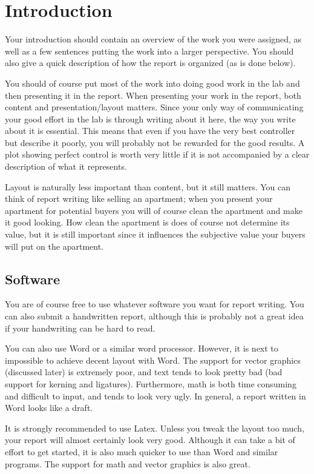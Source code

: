 \section{Introduction}
Your introduction should contain an overview of the work you were assigned, as well as a few sentences putting the work into a larger perspective. You should also give a quick description of how the report is organized (as is done below).

You should of course put most of the work into doing good work in the lab and then presenting it in the report. When presenting your work in the report, both content and presentation/layout matters. Since your only way of communicating your good effort in the lab is through writing about it here, the way you write about it is essential. This means that even if you have the very best controller but describe it poorly, you will probably not be rewarded for the good results. A plot showing perfect control is worth very little if it is not accompanied by a clear description of what it represents.

Layout is naturally less important than content, but it still matters. You can think of report writing like selling an apartment; when you present your apartment for potential buyers you will of course clean the apartment and make it good looking. How clean the apartment is does of course not determine its value, but it is still important since it influences the subjective value your buyers will put on the apartment. 

\subsection{Software}
You are of course free to use whatever software you want for report writing. You can also submit a handwritten report, although this is probably not a great idea if your handwriting can be hard to read. 

You can also use Word or a similar word processor. However, it is next to impossible to achieve decent layout with Word. The support for vector graphics (discussed later) is extremely poor, and text tends to look pretty bad (bad support for kerning and ligatures). Furthermore, math is both time consuming and difficult to input, and tends to look very ugly. In general, a report written in Word looks like a draft.

It is strongly recommended to use Latex. Unless you tweak the layout too much, your report will almost certainly look very good. Although it can take a bit of effort to get started, it is also much quicker to use than Word and similar programs. The support for math and vector graphics is also great.

